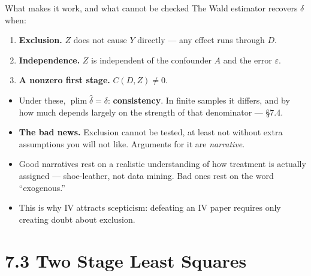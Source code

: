 \documentclass[
  11pt,
  ignorenonframetext,
  aspectratio=169,
]{beamer}
\providecommand{\tightlist}{%
  \setlength{\itemsep}{0pt}\setlength{\parskip}{0pt}}
\begin{document}
\begin{frame}{What makes it work, and what cannot be checked}
\protect{}\label{what-makes-it-work-and-what-cannot-be-checked}
The Wald estimator recovers \(\delta\) when:

\begin{enumerate}
\tightlist
\item
  \textbf{Exclusion.} \(Z\) does not cause \(Y\) directly --- any effect
  runs through \(D\).
\item
  \textbf{Independence.} \(Z\) is independent of the confounder \(A\)
  and the error \(\varepsilon\).
\item
  \textbf{A nonzero first stage.} \(C(D,Z) \neq 0\).
\end{enumerate}

\vspace{0.4em}

\begin{itemize}
\tightlist
\item
  Under these, \(\operatorname{plim} \hat\delta = \delta\):
  \textbf{consistency}. In finite samples it differs, and by how much
  depends largely on the strength of that denominator --- §7.4.
\item
  \textbf{The bad news.} Exclusion cannot be tested, at least not
  without extra assumptions you will not like. Arguments for it are
  \emph{narrative}.
\item
  Good narratives rest on a realistic understanding of how treatment is
  actually assigned --- shoe-leather, not data mining. Bad ones rest on
  the word ``exogenous.''
\item
  This is why IV attracts scepticism: defeating an IV paper requires
  only creating doubt about exclusion.
\end{itemize}
\end{frame}

\section{7.3 Two Stage Least Squares}\label{two-stage-least-squares}
\end{document}

